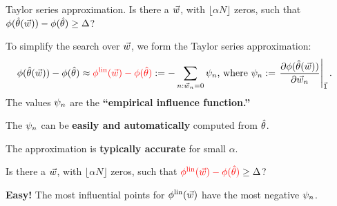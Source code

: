 \begin{frame}{Taylor series approximation.}
%
Is there a $\vec{w}$, with
$\lfloor \alpha N \rfloor$ zeros, such that
$\phi(\hat{\theta}(\vec{w})) - \phi(\hat{\theta}) \ge \Delta$?

\vspace{-0.5em}
\hrulefill

To simplify the search over $\vec{w}$, we form the Taylor series approximation:
%
\begin{align*}
	\phi(\hat{\theta}(\vec{w})) - \phi(\hat{\theta})
		&\approx
        \color{red}
        \phi^{\mathrm{lin}}(\vec{w}) - \phi(\hat{\theta})
        \color{black}
		:=  -
        \sum_{n: \vec{w}_n = 0} \psi_n
        \color{black}
\textrm{, where }
\psi_n := \left.\frac{\partial \phi(\hat{\theta}(\vec{w}))}{\partial \vec{w}_n}\right|_{\vec{1}}.
\end{align*}
%
\pause
The values $\psi_n$ are the
\textbf{``empirical influence function.''}
{\footnotesize \citep{hampel1986robustbook}}

The $\psi_n$ can be \textbf{easily
and automatically} computed from $\hat{\theta}$.

The approximation is
\textbf{typically accurate}
for small $\alpha$.
%
{\footnotesize
\citep{giordano2019higherorder}
}

\pause
\vspace{-0.5em}
\hrulefill

Is there a $\vec{w}$, with
$\lfloor \alpha N \rfloor$ zeros, such that
$\color{red} \phi^{\mathrm{lin}}(\vec{w}) - \phi(\hat{\theta}) \color{black} \ge \Delta$?

\pause
\textbf{Easy!}
The most influential points for $\phi^{\mathrm{lin}}(\vec{w})$ have the most negative
$\psi_n$.

\end{frame}





